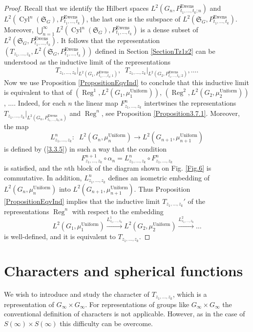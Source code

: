 \documentclass[12pt]{amsart}
\theoremstyle{definition}
\numberwithin{equation}{section}
\DeclareMathOperator{\Ewens}{Ewens}
\DeclareMathOperator{\Uniform}{Uniform}
\DeclareMathOperator{\Reg}{Reg}
\DeclareMathOperator{\Cyl}{Cyl}
\begin{document}
\begin{proof}
Recall
that we identify the Hilbert spaces $L^2\left(G_n, P_{t_1,\ldots,t_k;n}^{\Ewens}\right)$ and
$L^2\left(\Cyl^n\left(\mathfrak{S}_G\right), P_{t_1,\ldots,t_k}^{\Ewens}\right)$, the last one is the subspace of  $L^2\left(\mathfrak{S}_G, P_{t_1,\ldots,t_k}^{\Ewens}\right)$. Moreover,
$\bigcup_{n=1}^{\infty}L^2\left(\Cyl^n\left(\mathfrak{S}_G\right), P_{t_1,\ldots,t_k}^{\Ewens}\right)$ is a dense subset of $L^2\left(\mathfrak{S}_G, P_{t_1,\ldots,t_k}^{\Ewens}\right)$.
It follows that the representation
$\left(T_{z_1,\ldots,z_k}, L^2\left(\mathfrak{S}_{G}, P_{t_1,\ldots,t_k}^{\Ewens}\right)\right)$ defined in Section \ref{SectionTz1z2} can be understood as the inductive limit of the representations
$$
T_{z_1,\ldots,z_k}\biggl|_{ L^2\left(G_1, P_{t_1,\ldots,t_k;1}^{\Ewens}\right)},\;\;T_{z_1,\ldots,z_k}\biggl|_{ L^2\left(G_2, P_{t_1,\ldots,t_k;2}^{\Ewens}\right)},\ldots .
$$
Now we use Proposition \ref{PropositionEqvInd} to conclude that this inductive limit is equivalent to that of $\left(\Reg^1, L^2\left(G_1,\mu_1^{\Uniform}\right)\right)$,
$\left(\Reg^2, L^2\left(G_2,\mu_2^{\Uniform}\right)\right)$, $\ldots$. Indeed, for each $n$ the linear map $F_{z_1,\ldots,z_k}^n$ intertwines the representations
$T_{z_1,\ldots,z_k}\biggl|_{ L^2\left(G_n, P_{t_1,\ldots,t_k;n}^{\Ewens}\right)}$ and $\Reg^n$, see Proposition \ref{Proposition3.7.1}. Moreover, the map
$$
L^n_{z_1,\ldots,z_k}:\;\; L^2\left(G_n,\mu_n^{\Uniform}\right)\longrightarrow L^2\left(G_{n+1},\mu_{n+1}^{\Uniform}\right)
$$
is defined by (\ref{3.3.5}) in such a way that the condition
$$
F_{z_1,\ldots,z_k}^{n+1}\circ\alpha_n
=L_{z_1,\ldots,z_k}^n\circ F_{z_1,\ldots,z_k}^n
$$
is satisfied, and the $n$th block of the diagram shown on Fig. \ref{Fig.6}
is commutative. In addition,  $L^n_{z_1,\ldots,z_k}$ defines an isometric embedding of $L^2\left(G_n,\mu_n^{\Uniform}\right)$ into $L^2\left(G_{n+1},\mu_{n+1}^{\Uniform}\right)$.  Thus  Proposition \ref{PropositionEqvInd}
implies that the inductive limit $T_{z_1,\ldots,z_k}'$ of the representations
$\Reg^n$ with respect to the embedding
$$
L^2\left(G_1,\mu_1^{\Uniform}\right)\overset{L^1_{z_1,\ldots,z_k}}{\longrightarrow} L^2\left(G_2,\mu_2^{\Uniform}\right)
\overset{L^2_{z_1,\ldots,z_k}}{\longrightarrow}\ldots
$$
is well-defined, and it is equivalent to $T_{z_1,\ldots,z_k}$.
\end{proof}
\section{Characters and spherical functions}
We wish to introduce and study the character of $T_{z_1,\ldots,z_k}$, which is a  representation of $G_{\infty}\times G_{\infty}$.
For  representations of groups like $G_{\infty}\times G_{\infty}$
 the conventional definition of characters is not applicable. However, as in the case of $S(\infty)\times S(\infty)$ this difficulty can be overcome.
\end{document}
